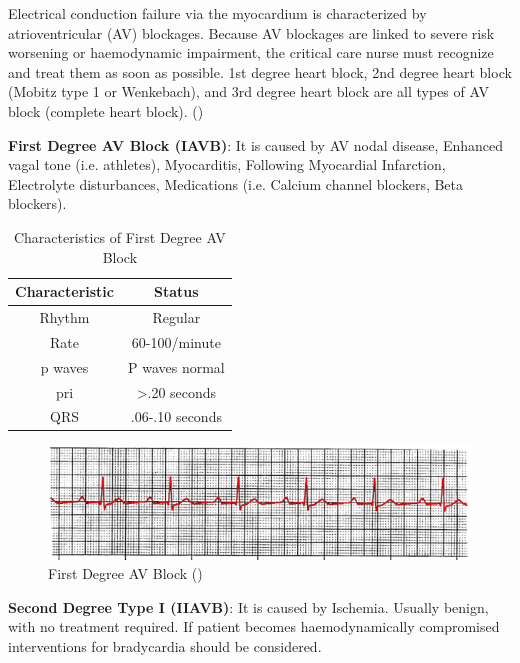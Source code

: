 Electrical conduction failure via the myocardium is characterized by atrioventricular (AV) blockages. Because AV blockages are linked to severe risk worsening or haemodynamic impairment, the critical care nurse must recognize and treat them as soon as possible. 1st degree heart block, 2nd degree heart block (Mobitz type 1 or Wenkebach), and 3rd degree heart block are all types of AV block (complete heart block).  (\cite{arryth_types})

\textbf{First Degree AV Block (IAVB)}: It is caused by AV nodal disease, Enhanced vagal tone (i.e. athletes), Myocarditis, Following Myocardial Infarction, Electrolyte disturbances, Medications (i.e. Calcium channel blockers, Beta blockers).

\begin{table}[H]
\begin{center}
\begin{tabular}{||c || c||}
 \hline
\textbf{Characteristic} & \textbf{Status} \\ [0.4ex] 
 \hline\hline
 Rhythm & Regular \\
\hline
Rate & 60-100/minute \\
\hline
p waves & P waves normal  \\
\hline
pri & >.20 seconds     \\
\hline
QRS & .06-.10 seconds \\
\hline\hline
\end{tabular}
\end{center}
\caption{Characteristics of First Degree AV Block}
\label{table:IAVB_characteristics}
\end{table}

 \begin{figure}[H]
\centering
\includegraphics[scale=0.8]{img/IAVB.png}
\caption{First Degree AV Block (\cite{arryth_types})}
\label{fig:IAVB}
\end{figure}


\textbf{Second Degree Type I (IIAVB)}: It is caused by Ischemia. Usually benign, with no treatment required. If patient becomes haemodynamically compromised interventions for bradycardia should be considered.


